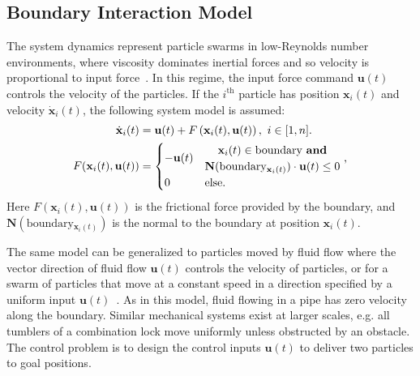 \subsection{Boundary Interaction Model}\label{subsec:WallFriction}
 The system dynamics represent particle swarms in low-Reynolds number environments, where viscosity dominates inertial forces and so velocity is proportional to input force~\cite{Purcell1977}. 
 In this regime, the input force command $\mathbf{u}(t)$ controls the velocity of the particles.  
 If the $i^{\textrm{th}}$ particle has position $\mathbf{x}_i(t)$ and velocity $\dot{\mathbf{x}}_i(t)$, the following system model is assumed:
 \begin{align}\label{eq:swarmDynamicsAndFric} 
\dot{\mathbf{x}}_i(t)
 &=
 \mathbf{u}(t)
 +F \left( \mathbf{x}_i(t), \mathbf{u}(t) \right), ~i \in [1,n].\\
 F(\mathbf{x}_i(t), \mathbf{u}(t)) &= \begin{cases}
  - \mathbf{u}(t) &\begin{matrix} \mathbf{x}_i(t) \in  \textrm{boundary \textbf{and}}\\
\mathbf{N}(\textrm{boundary$_{\mathbf{x}_i(t)}$})\cdot   \mathbf{u}(t) \le 0 \end{matrix}
\textrm{    ,} \\
 0 & \textrm{else}.
 \end{cases}\nonumber
 \end{align}
 Here  $F(\mathbf{x}_i(t), \mathbf{u}(t)) $ is the frictional force provided by the boundary, and
 $\mathbf{N}(\textrm{boundary$_{\mathbf{x}_i(t)}$})$ is the normal to the boundary at position $\mathbf{x}_i(t)$.
 
 
  The same model can be generalized to particles moved by fluid flow where the vector direction of fluid flow $\mathbf{u}(t)$ controls the velocity of particles, or for a swarm of particles that move at a constant speed in a direction specified by a uniform input $\mathbf{u}(t)$~\cite{Rubenstein2012}.
  As in this model, fluid flowing in a pipe has zero velocity along the boundary. Similar mechanical systems exist at larger scales, e.g. all tumblers of a combination lock move uniformly unless obstructed by an obstacle.
The control problem is to design the control inputs $\mathbf{u}(t)$ to deliver two particles to goal positions.
 
